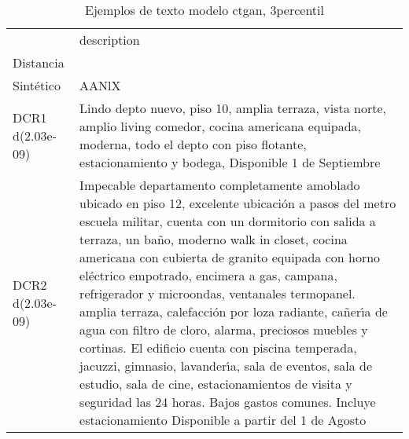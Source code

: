 \begin{table}[H]
\centering
\fontsize{10}{14}\selectfont
\caption{Ejemplos de texto modelo ctgan, 3percentil}
\label{table-example-economicos-b-2-ctgan-3p-text}
\begin{tabular}{|l|m{35em}|}
\hline
\rowcolor[gray]{0.8}
 & description \\
Distancia &  \\
\hline Sintético & AANlX \\
\hline DCR1 d(2.03e-09) & Lindo depto nuevo, piso 10, amplia terraza, vista norte, amplio living comedor, cocina americana equipada, moderna, todo el depto con piso flotante, estacionamiento y bodega, Disponible 1 de Septiembre \\
\hline DCR2 d(2.03e-09) & Impecable departamento completamente amoblado ubicado en piso 12, excelente ubicaci\'on a pasos del metro escuela militar, cuenta con un dormitorio con salida a terraza, un ba\~no, moderno walk in closet, cocina americana con cubierta de granito equipada con horno el\'ectrico empotrado, encimera a gas, campana, refrigerador y microondas, ventanales termopanel. amplia terraza, calefacci\'on por loza radiante, ca\~ner{\'\i}a de agua con filtro de cloro, alarma, preciosos muebles y cortinas.
El edificio cuenta con piscina temperada, jacuzzi, gimnasio, lavander{\'\i}a, sala de eventos, sala de estudio, sala de cine, estacionamientos de visita y seguridad las 24 horas. Bajos gastos comunes.
Incluye estacionamiento
Disponible a partir del 1 de Agosto \\
\hline
\end{tabular}
\end{table}
